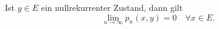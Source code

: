 Ist $y \in E$ ein nullrekurrenter Zustand, dann gilt
\begin{equation*}
\lim_{n \to \infty} p_{n}(x,y) = 0 \quad \forall x \in E.
\end{equation*} 